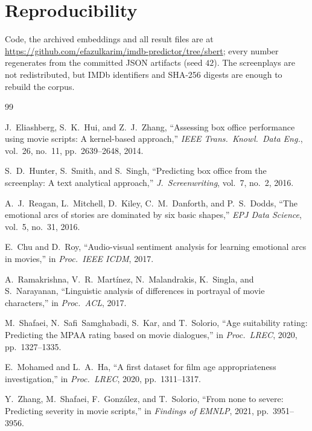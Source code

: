 \documentclass[conference,a4paper]{IEEEtran}
\begin{document}
\section*{Reproducibility}

Code, the archived embeddings and all result files are at
\url{https://github.com/efazulkarim/imdb-predictor/tree/sbert}; every
number regenerates from the committed JSON artifacts (seed $42$). The
screenplays are not redistributed, but IMDb identifiers and SHA-256
digests are enough to rebuild the corpus.

\begin{thebibliography}{99}
\footnotesize

J.~Eliashberg, S.~K.~Hui, and Z.~J.~Zhang, ``Assessing box office
performance using movie scripts: A kernel-based approach,''
\emph{IEEE Trans.\ Knowl.\ Data Eng.}, vol.~26, no.~11, pp.~2639--2648,
2014.

S.~D.~Hunter, S.~Smith, and S.~Singh, ``Predicting box office from the
screenplay: A text analytical approach,'' \emph{J.\ Screenwriting},
vol.~7, no.~2, 2016.

A.~J.~Reagan, L.~Mitchell, D.~Kiley, C.~M.~Danforth, and P.~S.~Dodds,
``The emotional arcs of stories are dominated by six basic shapes,''
\emph{EPJ Data Science}, vol.~5, no.~31, 2016.

E.~Chu and D.~Roy, ``Audio-visual sentiment analysis for learning
emotional arcs in movies,'' in \emph{Proc.\ IEEE ICDM}, 2017.

A.~Ramakrishna, V.~R.~Mart{\'i}nez, N.~Malandrakis, K.~Singla, and
S.~Narayanan, ``Linguistic analysis of differences in portrayal of movie
characters,'' in \emph{Proc.\ ACL}, 2017.

M.~Shafaei, N.~Safi~Samghabadi, S.~Kar, and T.~Solorio, ``Age
suitability rating: Predicting the MPAA rating based on movie
dialogues,'' in \emph{Proc.\ LREC}, 2020, pp.~1327--1335.

E.~Mohamed and L.~A.~Ha, ``A first dataset for film age appropriateness
investigation,'' in \emph{Proc.\ LREC}, 2020, pp.~1311--1317.

Y.~Zhang, M.~Shafaei, F.~Gonz{\'a}lez, and T.~Solorio, ``From none to
severe: Predicting severity in movie scripts,'' in \emph{Findings of
EMNLP}, 2021, pp.~3951--3956.


\end{thebibliography}
\end{document}

